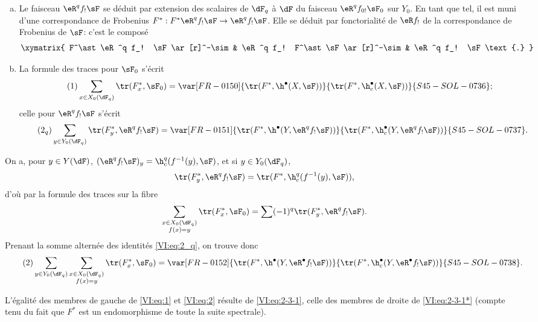 \begin{enumerate}[a)]
  \item Le faisceau $\eR^q f_! \sF$ se déduit par extension des scalaires de 
    $\dF_q$ à $\dF$ du faisceau $\eR^q f_{0!} \sF_0$ sur $Y_0$. En tant que 
    tel, il est muni d'une correspondance de Frobenius 
    $F^\ast:F^\ast\eR^q f_! \sF \to \eR^q f_! \sF$. Elle se déduit par 
    fonctorialité de $\eR f_!$ de la correspondance de Frobenius de $\sF$: 
    c'est le composé 
    \[\xymatrix{
      F^\ast \eR^q f_! \sF \ar[r]^-\sim 
        & \eR^q f_! F^\ast \sF \ar[r]^-\sim 
        & \eR^q f_! \sF \text{.}
    }\]
  \item La formule des traces pour $\sF_0$ s'écrit 
    \begin{align*}\tag{1}\label{VI:eq:1}
      \sum_{x\in X_0(\dF_q)} \tr(F_x^\ast,\sF_0) = \var[FR-0150]{\tr(F^\ast,\h^\bullet(X,\sF))}{\tr(F^\ast,\h_c^\bullet(X,\sF))}{S45-SOL-0736} \text{;}
    \end{align*}
    celle pour $\eR^q f_! \sF$ s'écrit 
    \begin{align*}\tag{2$_q$}\label{VI:eq:2_q} 
      \sum_{y\in Y_0(\dF_q)} \tr(F_y^\ast,\eR^q f_! \sF) = \var[FR-0151]{\tr(F^\ast, \h^\bullet(Y,\eR^q f_! \sF))}{\tr(F^\ast,\h_c^\bullet(Y,\eR^q f_! \sF))}{S45-SOL-0737} \text{.}
    \end{align*}
\end{enumerate}

On a, pour $y\in Y(\dF)$, $(\eR^q f_! \sF)_y = \h_c^q(f^{-1}(y),\sF)$, et si 
$y\in Y_0(\dF_q)$, 
\[
  \tr(F_y^\ast,\eR^q f_! \sF) = \tr(F^\ast,\h_c^q(f^{-1}(y),\sF)) \text{,}
\]
d'où par la formule des traces sur la fibre 
\[
  \sum_{\substack{x\in X_0(\dF_q) \\ f(x) = y}} \tr(F_x^\ast,\sF_0) = \sum (-1)^q \tr(F_y^\ast,\eR^q f_! \sF) \text{.}
\]
Prenant la somme alternée des identités \eqref{VI:eq:2_q}, on trouve donc 
\begin{align*}\tag{2}\label{VI:eq:2}
  \sum_{y\in Y_0(\dF_q)} \sum_{\substack{x \in X_0(\dF_q) \\ f(x) = y}} \tr(F_x^\ast,\sF_0) = \var[FR-0152]{\tr(F^\ast,\h^\bullet(Y,\eR^\bullet f_! \sF))}{\tr(F^\ast,\h_c^\bullet(Y,\eR^\bullet f_! \sF))}{S45-SOL-0738} \text{.}
\end{align*}

L'égalité des membres de gauche de \eqref{VI:eq:1} et \eqref{VI:eq:2} 
résulte de \eqref{VI:eq:2-3-1}, celle des membres de droite de 
\eqref{VI:eq:2-3-1*} (compte tenu du fait que $F^\ast$ est un endomorphisme de 
toute la suite spectrale). 





